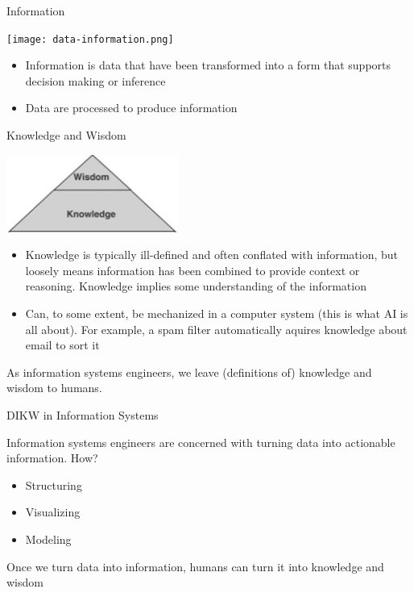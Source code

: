 \documentclass{beamer}
\begin{document}
\begin{frame}{Information}
\begin{center}
\texttt{[image: data-information.png]}
\end{center}
\begin{itemize}
\item Information is data that have been transformed into a form that
  supports decision making or inference
\item Data are processed to produce information
\end{itemize}

\end{frame}

\begin{frame}{Knowledge and Wisdom}

\begin{center}
\includegraphics[height=1in]{knowledge-wisdom.png}
\end{center}

\begin{itemize}
\item Knowledge is typically ill-defined and often conflated with
  information, but loosely means information has been combined to
  provide context or reasoning.  Knowledge implies some understanding
  of the information
\item Can, to some extent, be mechanized in a computer system (this is
  what AI is all about).  For example, a spam filter automatically
  aquires knowledge about email to sort it
\end{itemize}
As information systems engineers, we leave (definitions of) knowledge
and wisdom to humans.

\end{frame}

\begin{frame}{DIKW in Information Systems}

Information systems engineers are concerned with turning data into
actionable information.  How?
\begin{itemize}
\item Structuring
\item Visualizing
\item Modeling
\end{itemize}
Once we turn data into information, humans can turn it into knowledge
and wisdom

\end{frame}
\end{document}
